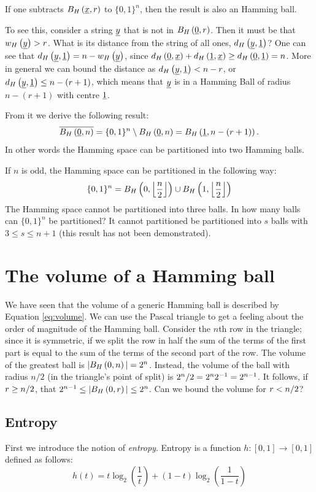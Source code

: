If one subtracts $B_H\left(\underline{x}, r\right)$ to $\{0, 1\}^n$, then the result is also an Hamming ball.

To see this, consider a string $\underline{y}$ that is not in $B_H\left(\underline{0}, r\right)$.
Then it must be that $w_H\left(\underline{y}\right) > r$.
What is its distance from the string of all ones, \ie $d_H \left({\underline{y},\underline{1}}\right)$?
One can see that $d_H \left({\underline{y},\underline{1}}\right) = n - w_H\left(\underline{y}\right)$, since $d_H \left({\underline{0},\underline{x}}\right) + d_H \left({\underline{1},\underline{x}}\right) \ge d_H \left({\underline{0},\underline{1}}\right) = n$.
More in general we can bound the distance as $d_H \left({\underline{y},\underline{1}}\right) < n - r$, or $d_H \left({\underline{y},\underline{1}}\right) \le n - (r+1)$, which means that $\underline{y}$ is in a Hamming Ball of radius $n - (r+1)$ with centre $\underline{1}$.

From it we derive the following result:
\begin{equation}
	\overline{B_H\left(\underline{0}, n\right)} = \{0,1\}^{n} \setminus B_H\left(\underline{0}, n\right) = B_H\left(\underline{1}, n - (r+1)\right).
\end{equation}
In other words the Hamming space can be partitioned into two Hamming balls.

If $n$ is odd, the Hamming space can be partitioned in the following way: $$\{0, 1\}^n = B_H\left(0, \left\lfloor{\frac{n}{2}}\right\rfloor\right) \cup B_H\left(1, \left\lfloor{\frac{n}{2}}\right\rfloor\right)$$
The Hamming space cannot be partitioned into three balls.
In how many balls can $\{0, 1\}^n$ be partitioned?
It cannot partitioned be partitioned into $s$ balls with $3 \leq s \leq n + 1$ (this result has not been demonstrated).

\section{The volume of a Hamming ball}
We have seen that the volume of a generic Hamming ball is described by Equation \ref{eq:volume}. We can use the Pascal triangle to get a feeling about the order of magnitude of the Hamming ball. Consider the $n$th row in the triangle; since it is symmetric, if we split the row in half the sum of the terms of the first part is equal to the sum of the terms of the second part of the row. The volume of the greatest ball is $|B_H\left(0, n\right)| = 2^n$. Instead, the volume of the ball with radius $n/2$ (in the triangle's point of split) is ${2^n}/{2} = 2^n2^{-1} = 2^{n-1}$. It follows, if $r \geq {n}/{2}$, that $2^{n-1} \leq |B_H\left(0, r\right)| \leq 2^n$. Can we bound the volume for $r < {n}/{2}$?

\subsection{Entropy}
First we introduce the notion of \emph{entropy}. Entropy is a function $h: [0, 1] \rightarrow [0, 1]$ defined as follows:
\begin{equation}
	h(t) = t\log_2(\dfrac{1}{t}) + (1 - t)\log_2\left(\dfrac{1}{1-t}\right)
\end{equation}

